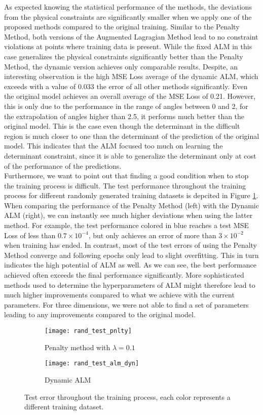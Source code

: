 As expected knowing the statistical performance of the methods, the deviations from the physical constraints are significantly smaller when we apply one of the proposed methods compared to the original training. Similar to the Penalty Method, both versions of the Augmented Lagragian Method lead to no constraint violations at points where training data is present. While the fixed ALM in this case generalizes the physical constraints significantly better than the Penalty Method, the dynamic version achieves only comparable results. Despite, an interesting observation is the high MSE Loss average of the dynamic ALM, which exceeds with a value of 0.033 the error of all other methods significantly. Even the original model achieves an overall average of the MSE Loss of 0.21. However, this is only due to the performance in the range of angles between 0 and 2, for the extrapolation of angles higher than 2.5, it performs much better than the original model. This is the case even though the determinant in the difficult region is much closer to one than the determinant of the prediction of the original model. This indicates that the ALM focused too much on learning the determinant constraint, since it is able to generalize the determinant only at cost of the performance of the predictions.\\
\indent Furthermore, we want to point out that finding a good condition when to stop the training process is difficult. The test performance throughout the training process for different randomly generated training datasets is depcited in Figure \ref{fig:test_training}. When comparing the performance of the Penalty Method (left) with the Dynamic ALM (right), we can instantly see much higher deviations when using the latter method. For example, the test performance colored in blue reaches a test MSE Loss of less than $0.7\times 10^{-4}$, but only achieves an error of more than $3\times 10^{-2}$ when training has ended. In contrast, most of the test errors of using the Penalty Method converge and following epochs only lead to slight overfitting. This in turn indicates the high potential of ALM as well. As we can see, the best performance achieved often exceeds the final performance significantly. More sophisticated methods used to determine the hyperparameters of ALM  might therefore lead to much higher improvements compared to what we achieve with the current parameters. For three dimensions, we were not able to find a set of parameters leading to any improvements compared to the original model.
\begin{figure}
	\centering
	\begin{subfigure}{.5\textwidth}
		\centering
		\texttt{[image: rand\_test\_pnlty]}
		\caption{Penalty method with $\lambda = 0.1$}
	\end{subfigure}%
	\begin{subfigure}{.5\textwidth}
		\centering
		\texttt{[image: rand\_test\_alm\_dyn]}
		\caption{Dynamic ALM}
	\end{subfigure}
	\caption{Test error throughout the training process, each color represents a different training dataset.}
	\label{fig:test_training}
\end{figure}
